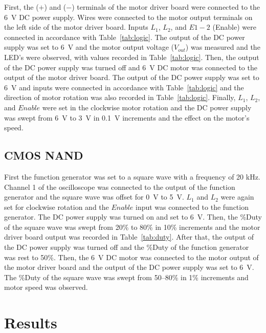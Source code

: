 First, the ($+$) and ($-$) terminals of the motor driver board were connected to the \SI{6}{V} DC power supply.  Wires were connected to the motor output terminals on the left side of the motor driver board.  Inputs $L_1$, $L_2$, and $E1-2$ (Enable) were connected in accordance with Table~\ref{tab:logic}.  The output of the DC power supply was set to \SI{6}{V} and the motor output voltage ($V_{out}$) was measured and the LED's were observed, with values recorded in Table~\ref{tab:logic}.  Then, the output of the DC power supply was turned off and \SI{6}{V} DC motor was connected to the output of the motor driver board.  The output of the DC power supply was set to \SI{6}{V} and inputs were connected in accordance with Table~\ref{tab:logic} and the direction of motor rotation was also recorded in Table~\ref{tab:logic}.  Finally, $L_1$, $L_2$, and $Enable$ were set in the clockwise motor rotation and the DC power supply was swept from \SI{6}{V} to \SI{3}{V} in \SI{0.1}{V} increments and the effect on the motor's speed.

\subsection{CMOS NAND}
\label{sec:nand}

First the function generator was set to a square wave with a frequency of 20 kHz.  Channel 1 of the oscilloscope was connected to the output of the function generator and the square wave was offset for \SI{0}{V} to \SI{5}{V}.  $L_1$ and $L_2$ were again set for clockwise rotation and the $Enable$ input was connected to the function generator.  The DC power supply was turned on and set to \SI{6}{V}.  Then, the \%Duty of the square wave was swept from 20\% to 80\% in 10\% increments and the motor driver board output was recorded in Table~\ref{tab:duty}.  After that, the output of the DC power supply was turned off and the \%Duty of the function generator was rest to 50\%.  Then, the \SI{6}{V} DC motor was connected to the motor output of the motor driver board and the output of the DC power supply was set to \SI{6}{V}.  The \%Duty of the square wave was swept from 50--80\% in 1\% increments and motor speed was observed.

\section{Results}
\label{sec:results}

